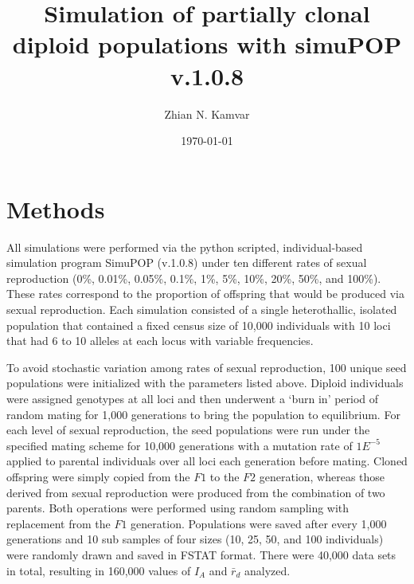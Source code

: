 \documentclass[letterpaper, 10pt]{article}
\title{Simulation of partially clonal diploid populations with simuPOP v.1.0.8}
\author{Zhian N. Kamvar}
\date{\today}
\newcommand{\tab}{\hspace*{1.5em}}
\begin{document}
\maketitle
\linenumbers
{}
\section{Methods}
\tab All simulations were performed via the python scripted, individual-based simulation program SimuPOP (v.1.0.8) under ten different rates of sexual reproduction (0\%, 0.01\%, 0.05\%, 0.1\%, 1\%, 5\%, 10\%, 20\%, 50\%, and 100\%).
These rates correspond to the proportion of offspring that would be produced via sexual reproduction. 
Each simulation consisted of a single heterothallic, isolated population that contained a fixed census size of 10,000 individuals with 10 loci that had 6 to 10 alleles at each locus with variable frequencies. 

To avoid stochastic variation among rates of sexual reproduction, 100 unique seed populations were initialized with the parameters listed above.
Diploid individuals were assigned genotypes at all loci and then underwent a `burn in' period of random mating for 1,000 generations to bring the population to equilibrium. 
For each level of sexual reproduction, the seed populations were run under the specified mating scheme for 10,000 generations with a mutation rate of $1E^{-5}$ applied to parental individuals over all loci each generation before mating. 
Cloned offspring were simply copied from the $F1$ to the $F2$ generation, whereas those derived from sexual reproduction were produced from the combination of two parents. 
Both operations were performed using random sampling with replacement from the $F1$ generation.
Populations were saved after every 1,000 generations and 10 sub samples of four sizes (10, 25, 50, and 100 individuals) were randomly drawn and saved in FSTAT format. There were 40,000 data sets in total, resulting in 160,000 values of $I_A$ and $\bar{r}_d$ analyzed.
\end{document}
